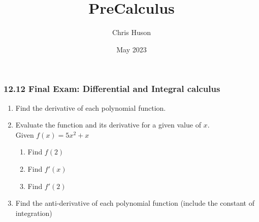 \documentclass[12pt, twoside]{article}
\title{PreCalculus}
\author{Chris Huson}
\date{May 2023}
\begin{document}
\subsubsection*{12.12 Final Exam: Differential and Integral calculus}
\begin{enumerate}

\item Find the derivative of each polynomial function.
\begin{enumerate}
\end{enumerate} \vspace{1cm}

\item Evaluate the function and its derivative for a given value of $x$.\\[0.3cm] 
  Given $f(x)=5x^2+x$
  \begin{enumerate}[itemsep=2cm]
    \item Find $f(2)$
    \item Find $f'(x)$
    \item Find $f'(2)$
  \end{enumerate} \vspace{3cm}

\item Find the anti-derivative of each polynomial function (include the constant of integration)
  \begin{enumerate}
  \end{enumerate} \vspace{1cm}


\end{enumerate}
\end{document}
